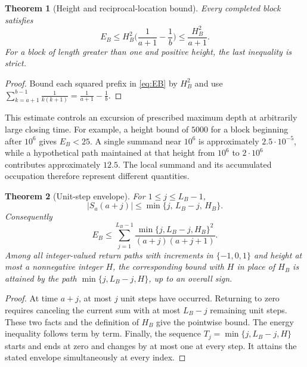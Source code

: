 \documentclass[11pt]{article}
\newtheorem{theorem}{Theorem}[section]
\theoremstyle{definition}
\theoremstyle{remark}
\begin{document}
\begin{theorem}[Height and reciprocal-location bound]\label{thm:height}
Every completed block satisfies
\begin{equation}\label{eq:heightbound}
E_B\le H_B^2\Big(\frac1{a+1}-\frac1b\Big)\le\frac{H_B^2}{a+1}.
\end{equation}
For a block of length greater than one and positive height, the last inequality is strict.
\end{theorem}

\begin{proof}
Bound each squared prefix in \eqref{eq:EB} by $H_B^2$ and use $\sum_{k=a+1}^{b-1}\frac1{k(k+1)}=\frac1{a+1}-\frac1b$.
\end{proof}

This estimate controls an excursion of prescribed maximum depth at arbitrarily large closing time. For example, a height bound of $5000$ for a block beginning after $10^6$ gives $E_B<25$. A single summand near $10^6$ is approximately $2.5\cdot10^{-5}$, while a hypothetical path maintained at that height from $10^6$ to $2\cdot10^6$ contributes approximately $12.5$. The local summand and its accumulated occupation therefore represent different quantities.

\begin{theorem}[Unit-step envelope]\label{thm:envelope}
For $1\le j\le L_B-1$,
\begin{equation}
|S_a(a+j)|\le\min\{j,\,L_B-j,\,H_B\}.
\end{equation}
Consequently
\begin{equation}\label{eq:envelope}
E_B\le\sum_{j=1}^{L_B-1}\frac{\min\{j,L_B-j,H_B\}^2}{(a+j)(a+j+1)}.
\end{equation}
Among all integer-valued return paths with increments in $\{-1,0,1\}$ and height at most a nonnegative integer $H$, the corresponding bound with $H$ in place of $H_B$ is attained by the path $\min\{j,L_B-j,H\}$, up to an overall sign.
\end{theorem}

\begin{proof}
At time $a+j$, at most $j$ unit steps have occurred. Returning to zero requires canceling the current sum with at most $L_B-j$ remaining unit steps. These two facts and the definition of $H_B$ give the pointwise bound. The energy inequality follows term by term. Finally, the sequence $T_j=\min\{j,L_B-j,H\}$ starts and ends at zero and changes by at most one at every step. It attains the stated envelope simultaneously at every index.
\end{proof}
\end{document}
